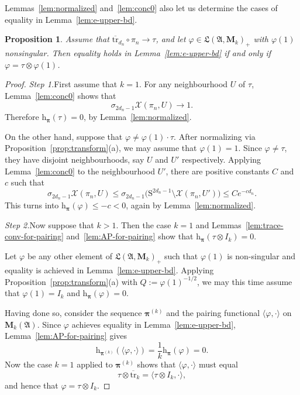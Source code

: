 \documentclass[12pt,a4paper]{article}
\numberwithin{equation}{section}
\newtheorem{prop}[thm]{Proposition}
\theoremstyle{remark}
\renewcommand{\rm}[1]{\mathrm{#1}}
\newcommand{\rmM}{\mathbf{M}}
\newcommand{\rmh}{\mathrm{h}}
\newcommand{\X}{\mathcal{X}}
\newcommand{\A}{\mathfrak{A}}
\newcommand{\frL}{\mathfrak{L}}
\renewcommand{\phi}{\varphi}
\newcommand{\s}{\sigma}
\newcommand{\bspi}{\boldsymbol{\pi}}
\newcommand{\tr}{\overline{\mathrm{tr}}}
\begin{document}
Lemmas~\ref{lem:normalized} and~\ref{lem:conc0} also let us determine the cases of equality in Lemma~\ref{lem:e-upper-bd}.

\begin{prop}\label{prop:max-ent}
Assume that $\tr_{d_n}\circ \pi_n\to \tau$, and let $\phi \in \frL(\A,\rmM_k)_+$ with $\phi(1)$ nonsingular. Then equality holds in Lemma~\ref{lem:e-upper-bd} if and only if $\phi = \tau\otimes \phi(1)$.
\end{prop}

\begin{proof}
\emph{Step 1.}\quad First assume that $k=1$.  For any neighbourhood $U$ of $\tau$, Lemma~\ref{lem:conc0} shows that
\[\s_{2d_n-1}\X(\pi_n,U) \to 1.\]
Therefore $\rmh_{\bspi}(\tau) = 0$, by Lemma~\ref{lem:normalized}.

On the other hand, suppose that $\phi \ne \phi(1)\cdot \tau$.  After normalizing via Proposition~\ref{prop:transform}(a), we may assume that $\phi(1) = 1$.  Since $\phi \ne \tau$, they have disjoint neighbourhoods, say $U$ and $U'$ respectively.  Applying Lemma~\ref{lem:conc0} to the neighbourhood $U'$, there are positive constants $C$ and $c$ such that
\[\s_{2d_n-1}\X(\pi_n,U) \le\s_{2d_n-1}\big(\rm{S}^{2d_n-1}\setminus \X(\pi_n,U')\big)\le Ce^{-cd_n}.\]
This turns into $\rmh_{\bspi}(\phi) \le -c < 0$, again by Lemma~\ref{lem:normalized}.

\vspace{7pt}

\emph{Step 2.}\quad Now suppose that $k > 1$.  Then the case $k=1$ and Lemmas~\ref{lem:trace-conv-for-pairing} and~\ref{lem:AP-for-pairing} show that $\rmh_{\bspi}(\tau \otimes I_k) = 0$.

Let $\phi$ be any other element of $\frL(\A,\rmM_k)_+$ such that $\phi(1)$ is non-singular and equality is achieved in Lemma~\ref{lem:e-upper-bd}.  Applying Proposition~\ref{prop:transform}(a) with $Q := \phi(1)^{-1/2}$, we may this time assume that $\phi(1) = I_k$ and $\rmh_{\bspi}(\phi) = 0$.
	
Having done so, consider the sequence $\bspi^{(k)}$ and the pairing functional $\langle \phi,\cdot\rangle$ on $\rmM_k(\A)$.   Since $\phi$ achieves equality in Lemma~\ref{lem:e-upper-bd}, Lemma~\ref{lem:AP-for-pairing} gives
\[\rmh_{\bspi^{(k)}}(\langle \phi,\cdot\rangle) = \frac{1}{k}\rmh_{\bspi}(\phi) = 0.\]
Now the case $k=1$ applied to $\bspi^{(k)}$ shows that $\langle\phi,\cdot\rangle$ must equal
\[\tau\otimes \tr_k = \langle \tau\otimes I_k,\cdot\rangle,\]
and hence that $\phi = \tau\otimes I_k$.
\end{proof}
\end{document}
